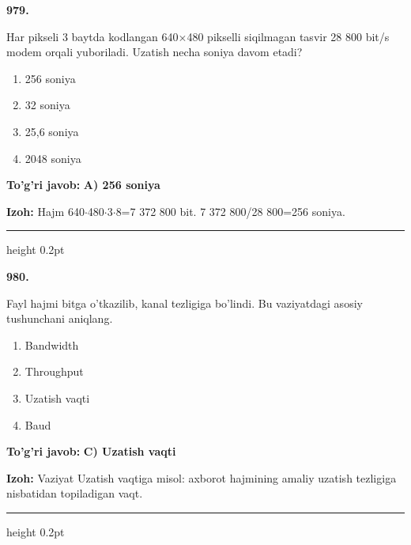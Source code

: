 \documentclass[10pt,a4paper,oneside]{article}
\begin{document}
\noindent\textbf{\color{ink}979.}
\par
Har pikseli 3 baytda kodlangan 640\ensuremath{\times}480 pikselli siqilmagan tasvir 28 800 bit/s modem orqali yuboriladi. Uzatish necha soniya davom etadi?
\begin{enumerate}[label=\Alph*),leftmargin=9mm]
\item 256 soniya
\item 32 soniya
\item 25,6 soniya
\item 2048 soniya
\end{enumerate}
\begin{tcolorbox}[enhanced,breakable,colback=teal!4,colframe=teal!50!black,boxrule=0.5pt,arc=1.1mm,left=3mm,right=3mm,top=1.7mm,bottom=1.7mm,before skip=2mm,after skip=2mm]
\textbf{\color{teal}To'g'ri javob:} \textbf{A) 256 soniya}
\par\smallskip
\textbf{Izoh:} Hajm 640\ensuremath{\cdot}480\ensuremath{\cdot}3\ensuremath{\cdot}8=7 372 800 bit. 7 372 800/28 800=256 soniya.
\end{tcolorbox}
\vspace{2mm}\hrule height 0.2pt \vspace{3mm}

\noindent\textbf{\color{ink}980.}
\par
Fayl hajmi bitga o'tkazilib, kanal tezligiga bo'lindi. Bu vaziyatdagi asosiy tushunchani aniqlang.
\begin{enumerate}[label=\Alph*),leftmargin=9mm]
\item Bandwidth
\item Throughput
\item Uzatish vaqti
\item Baud
\end{enumerate}
\begin{tcolorbox}[enhanced,breakable,colback=teal!4,colframe=teal!50!black,boxrule=0.5pt,arc=1.1mm,left=3mm,right=3mm,top=1.7mm,bottom=1.7mm,before skip=2mm,after skip=2mm]
\textbf{\color{teal}To'g'ri javob:} \textbf{C) Uzatish vaqti}
\par\smallskip
\textbf{Izoh:} Vaziyat Uzatish vaqtiga misol: axborot hajmining amaliy uzatish tezligiga nisbatidan topiladigan vaqt.
\end{tcolorbox}
\vspace{2mm}\hrule height 0.2pt \vspace{3mm}
\end{document}
